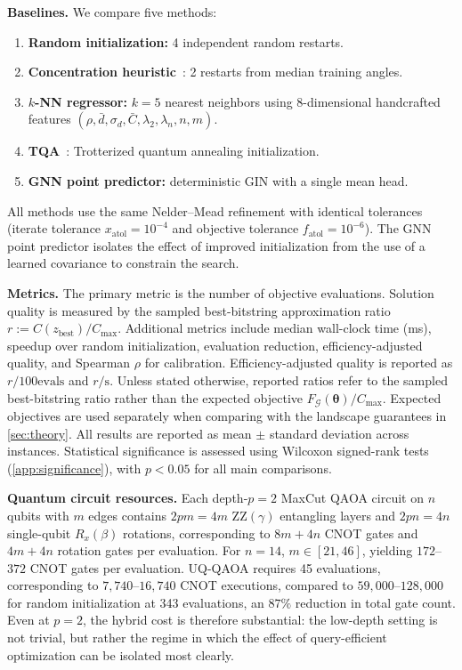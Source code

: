 \documentclass[aps,prx,reprint,superscriptaddress,longbibliography]{revtex4-2}
\newcommand{\QAOA}{\textnormal{\textsc{QAOA}}}
\newcommand{\GNN}{\textnormal{\textsc{GNN}}}
\newcommand{\GIN}{\textnormal{\textsc{GIN}}}
\newcommand{\UQQAOA}{\textnormal{\textsc{UQ-QAOA}}}
\newcommand{\calG}{\mathcal{G}}
\begin{document}
\textbf{Baselines.}
We compare five methods:
\begin{enumerate}[leftmargin=*,itemsep=1pt]
\item \textbf{Random initialization:} 4 independent random restarts.
\item \textbf{Concentration heuristic}~\cite{brandao2018,wurtz2021}:
2 restarts from median training angles.
\item \textbf{$k$-NN regressor:} $k{=}5$ nearest neighbors using
8-dimensional handcrafted features
$(\rho, \bar{d}, \sigma_d, \bar{C}, \lambda_2, \lambda_n, n, m)$.
\item \textbf{TQA}~\cite{sack2021}: Trotterized quantum annealing
initialization.
\item \textbf{\GNN{} point predictor:} deterministic \GIN{} with a
single mean head.
\end{enumerate}
All methods use the same Nelder--Mead refinement with identical
tolerances (iterate tolerance $x_{\mathrm{atol}}{=}10^{-4}$ and
objective tolerance $f_{\mathrm{atol}}{=}10^{-6}$). The \GNN{} point predictor isolates the
effect of improved initialization from the use of a learned covariance
to constrain the search.

\textbf{Metrics.}
The primary metric is the number of objective evaluations.
Solution quality is measured by the sampled best-bitstring
approximation ratio
$r := C(z_{\mathrm{best}})/C_{\max}$.
Additional metrics include median wall-clock time (ms), speedup over
random initialization, evaluation reduction, efficiency-adjusted
quality, and Spearman $\rho$ for calibration.
Efficiency-adjusted quality is reported as $r/100\text{evals}$ and
$r/\text{s}$.
Unless stated otherwise, reported ratios refer to the sampled
best-bitstring ratio rather than the expected objective
$F_\calG(\bm\theta)/C_{\max}$.
Expected objectives are used separately when comparing with the
landscape guarantees in \cref{sec:theory}.
All results are reported as mean $\pm$ standard deviation across
instances. Statistical significance is assessed using Wilcoxon
signed-rank tests (\cref{app:significance}), with $p < 0.05$ for all
main comparisons.

\textbf{Quantum circuit resources.}
Each depth-$p{=}2$ MaxCut \QAOA{} circuit on $n$ qubits with $m$
edges contains $2pm = 4m$ $\mathrm{ZZ}(\gamma)$ entangling layers and
$2pn = 4n$ single-qubit $R_x(\beta)$ rotations, corresponding to
$8m + 4n$ CNOT gates and $4m + 4n$ rotation gates per evaluation.
For $n{=}14$, $m \in [21,46]$, yielding $172$--$372$ CNOT gates per
evaluation. \UQQAOA{} requires 45 evaluations, corresponding to
$7{,}740$--$16{,}740$ CNOT executions, compared to
$59{,}000$--$128{,}000$ for random initialization at 343 evaluations,
an $87\%$ reduction in total gate count.
Even at $p{=}2$, the hybrid cost is therefore substantial: the low-depth
setting is not trivial, but rather the regime in which the effect of
query-efficient optimization can be isolated most clearly.
\end{document}
